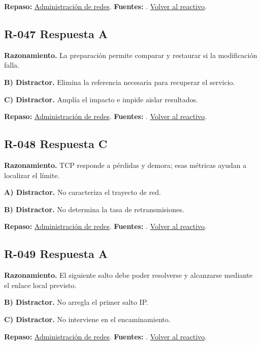 \textbf{Repaso:} \hyperref[sec:r2]{Administración de redes}. \textbf{Fuentes:} \cite{rfc2131,rfc1034,rfc9293,networks}. \hyperref[q:R-046]{Volver al reactivo}.\par\medskip

\subsection*{R-047 \quad Respuesta A}\label{s:R-047}
\textbf{Razonamiento.} La preparación permite comparar y restaurar si la modificación falla.

\textbf{B) Distractor. }Elimina la referencia necesaria para recuperar el servicio.

\textbf{C) Distractor. }Amplía el impacto e impide aislar resultados.

\textbf{Repaso:} \hyperref[sec:r2]{Administración de redes}. \textbf{Fuentes:} \cite{rfc2131,rfc1034,rfc9293,networks}. \hyperref[q:R-047]{Volver al reactivo}.\par\medskip

\subsection*{R-048 \quad Respuesta C}\label{s:R-048}
\textbf{Razonamiento.} TCP responde a pérdidas y demora; esas métricas ayudan a localizar el límite.

\textbf{A) Distractor. }No caracteriza el trayecto de red.

\textbf{B) Distractor. }No determina la tasa de retransmisiones.

\textbf{Repaso:} \hyperref[sec:r2]{Administración de redes}. \textbf{Fuentes:} \cite{rfc2131,rfc1034,rfc9293,networks}. \hyperref[q:R-048]{Volver al reactivo}.\par\medskip

\subsection*{R-049 \quad Respuesta A}\label{s:R-049}
\textbf{Razonamiento.} El siguiente salto debe poder resolverse y alcanzarse mediante el enlace local previsto.

\textbf{B) Distractor. }No arregla el primer salto IP.

\textbf{C) Distractor. }No interviene en el encaminamiento.

\textbf{Repaso:} \hyperref[sec:r2]{Administración de redes}. \textbf{Fuentes:} \cite{rfc2131,rfc1034,rfc9293,networks}. \hyperref[q:R-049]{Volver al reactivo}.\par\medskip

